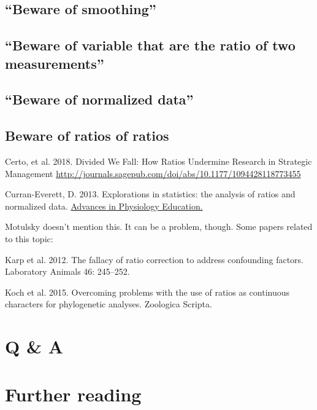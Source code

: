\documentclass[]{book}
\theoremstyle{definition}
\theoremstyle{definition}
\theoremstyle{definition}
\theoremstyle{remark}
\begin{document}
\subsection{\texorpdfstring{``Beware of
smoothing''}{Beware of smoothing}}\label{beware-of-smoothing}

\subsection{\texorpdfstring{``Beware of variable that are the ratio of
two
measurements''}{Beware of variable that are the ratio of two measurements}}\label{beware-of-variable-that-are-the-ratio-of-two-measurements}

\subsection{\texorpdfstring{``Beware of normalized
data''}{Beware of normalized data}}\label{beware-of-normalized-data}

\subsection*{Beware of ratios of
ratios}\label{beware-of-ratios-of-ratios}

Certo, et al. 2018. Divided We Fall: How Ratios Undermine Research in
Strategic Management
\url{http://journals.sagepub.com/doi/abs/10.1177/1094428118773455}

Curran-Everett, D. 2013. Explorations in statistics: the analysis of
ratios and normalized data.
\href{https://www.physiology.org/doi/abs/10.1152/advan.00053.2013}{Advances
in Physiology Education.}

Motulsky doesn't mention this. It can be a problem, though. Some papers
related to this topic:

Karp et al. 2012. The fallacy of ratio correction to address confounding
factors. Laboratory Animals 46: 245--252.

Koch et al. 2015. Overcoming problems with the use of ratios as
continuous characters for phylogenetic analyses. Zoologica Scripta.

\section{Q \& A}\label{q-a-1}

\section*{Further reading}\label{further-reading-2}
\end{document}
